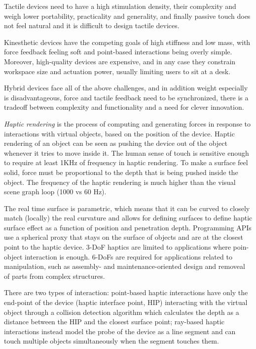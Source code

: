 \documentclass[a4paper]{article}
\begin{document}
Tactile devices need to have a high stimulation density, their complexity and weigh lower portability, practicality and generality, and finally passive touch does not feel natural and it is difficult to design tactile devices.

Kinesthetic devices have the competing goals of high stiffness and low mass, with force feedback feeling soft and point-based interactions being overly simple.
Moreover, high-quality devices are expensive, and in any case they constrain workspace size and actuation power, usually limiting users to sit at a desk.

Hybrid devices face all of the above challenges, and in addition weight especially is disadvantageous, force and tactile feedback need to be synchronized, there is a tradeoff between complexity and functionality and a need for clever innovation.

\emph{Haptic rendering} is the process of computing and generating forces in response to interactions with virtual objects, based on the position of the device.
Haptic rendering of an object can be seen as pushing the device out of the object whenever it tries to move inside it. The human sense of touch is sensitive enough to require at least 1KHz of frequency in haptic rendering.
To make a surface feel solid, force must be proportional to the depth that is being pushed inside the object.
The frequency of the haptic rendering is much higher than the visual scene graph loop (1000 vs 60 Hz).

The real time surface is parametric, which means that it can be curved to closely match (locally) the real curvature and allows for defining surfaces to define haptic surface effect as a function of position and penetration depth.
Programming APIs use a spherical proxy that stays on the surface of objects and are at the closest point to the haptic device.
3-DoF haptics are limited to applications where poin-object interaction is enough.
6-DoFs are required for applications related to manipulation, such as assembly- and maintenance-oriented design and removeal of parts from complex structures.

There are two types of interaction: point-based haptic interactions have only the end-point of the device (haptic interface point, HIP) interacting with the virtual object through a collision detection algorithm which calculates the depth as a distance between the HIP and the closest surface point; ray-based haptic interactions instead model the probe of the device as a line segment and can touch multiple objects simultaneously when the segment touches them.
\end{document}
